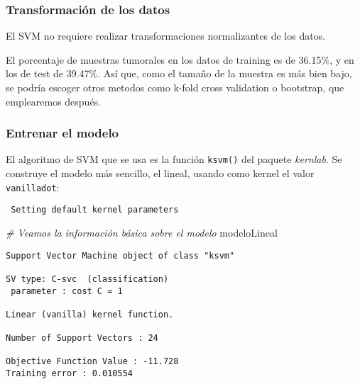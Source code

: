 \documentclass[
]{article}
\newenvironment{Shaded}{\begin{snugshade}}{\end{snugshade}}
\newcommand{\CommentTok}[1]{\textcolor[rgb]{0.56,0.35,0.01}{\textit{#1}}}
\newcommand{\DataTypeTok}[1]{\textcolor[rgb]{0.13,0.29,0.53}{#1}}
\newcommand{\KeywordTok}[1]{\textcolor[rgb]{0.13,0.29,0.53}{\textbf{#1}}}
\newcommand{\NormalTok}[1]{#1}
\newcommand{\OperatorTok}[1]{\textcolor[rgb]{0.81,0.36,0.00}{\textbf{#1}}}
\newcommand{\StringTok}[1]{\textcolor[rgb]{0.31,0.60,0.02}{#1}}
\begin{document}
\hypertarget{transformaciuxf3n-de-los-datos-3}{%
\subsubsection{Transformación de los
datos}\label{transformaciuxf3n-de-los-datos-3}}

El SVM no requiere realizar transformaciones normalizantes de los datos.

El porcentaje de muestras tumorales en los datos de training es de
36.15\%, y en los de test de 39.47\%. Así que, como el tamaño de la
muestra es más bien bajo, se podría escoger otros metodos como k-fold
cross validation o bootstrap, que emplearemos después.

\hypertarget{entrenar-el-modelo-3}{%
\subsubsection{Entrenar el modelo}\label{entrenar-el-modelo-3}}

El algoritmo de SVM que se usa es la función \texttt{ksvm()} del paquete
\emph{kernlab}. Se construye el modelo más sencillo, el lineal, usando
como kernel el valor \texttt{vanilladot}:

\begin{Shaded}
\end{Shaded}

\begin{verbatim}
 Setting default kernel parameters  
\end{verbatim}

\begin{Shaded}
\begin{Highlighting}[]
\CommentTok{# Veamos la información básica sobre el modelo}
\NormalTok{modeloLineal}
\end{Highlighting}
\end{Shaded}

\begin{verbatim}
Support Vector Machine object of class "ksvm" 

SV type: C-svc  (classification) 
 parameter : cost C = 1 

Linear (vanilla) kernel function. 

Number of Support Vectors : 24 

Objective Function Value : -11.728 
Training error : 0.010554 
\end{verbatim}
\end{document}
